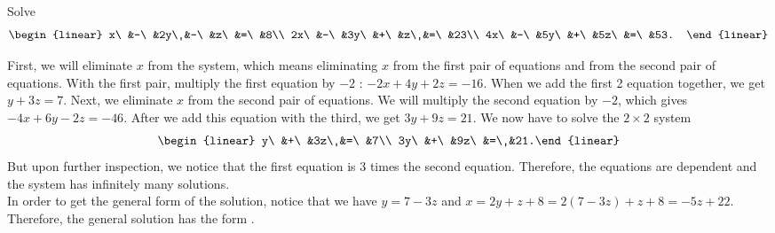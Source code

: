  \begin{AppExam} Solve \[\begin{linear} x\ &-\ &2y\ &-\ &z\ &=\ &8\\ 2x\ &-\ &3y\ &+\ &z\ &=\ &23\\ 4x\ &-\ &5y\ &+\ &5z\ &=\ &53. \end{linear}\]

First, we will eliminate $x$ from the system, which means eliminating $x$ from the first pair of equations and from the second pair of equations. With the first pair, multiply the first equation by $-2$ : $-2x+4y+2z = -16$. When we add the first 2 equation together, we get $y+3z=7.$ Next, we eliminate $x$ from the second pair of equations. We will multiply the second equation by $-2$, which gives $-4x+6y-2z=-46$. After we add this equation with the third, we get $3y+9z=21.$ We now have to solve the $2\times 2$ system \[\begin{linear} y\ &+\ &3z\ &=\ &7\\ 3y\ &+\ &9z\ &=\ &21.\end{linear}\] But upon further inspection, we notice that the first equation is 3 times the second equation. Therefore, the equations are dependent and the system has infinitely many solutions. \\

In order to get the general form of the solution, notice that we have $y = 7-3z$ and $x = 2y+z+8 = 2(7-3z)  +z+8 = -5z + 22$. Therefore, the general solution has the form . 
\end{AppExam}\vs


